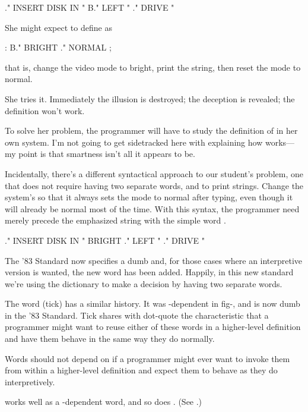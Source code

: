 \begin{Code}
." INSERT DISK IN "  B." LEFT "  ." DRIVE "
\end{Code}
She might expect to define  as

\begin{Code}
: B."   BRIGHT  ."  NORMAL ;
\end{Code}
that is, change the video mode to bright, print the string, then reset the
mode to normal.

She tries it. Immediately the illusion is destroyed; the deception is
revealed; the definition won't work.

To solve her problem, the programmer will have to study the definition of
 in her own system. I'm not going to get sidetracked here with
explaining how  works---my point is that smartness isn't all
it appears to be.

Incidentally, there's a different syntactical approach to our student's
problem, one that does not require having two separate words, 
and  to print strings. Change the system's  so that
it always sets the mode to normal after typing, even though it will
already be normal most of the time. With this syntax, the programmer need
merely precede the emphasized string with the simple word .

\begin{Code}
." INSERT DISK IN "  BRIGHT ." LEFT "  ." DRIVE "
\end{Code}
The '83 Standard now specifies a dumb  and, for those cases
where an interpretive version is wanted, the new word  has been
added. Happily, in this new standard we're using the dictionary to make a
decision by having two separate words.

The word  (tick) has a similar history. It was
-dependent in fig-\Forth{}, and is now dumb in the '83
Standard. Tick shares with dot-quote the characteristic that a programmer
might want to reuse either of these words in a higher-level definition and
have them behave in the same way they do normally.%

\begin{tip}
Words should not depend on  if a programmer might ever want
to invoke them from within a higher-level definition and expect them to
behave as they do interpretively.
\end{tip}
 works well as a -dependent
word, and so does . (See .)%
%
%

